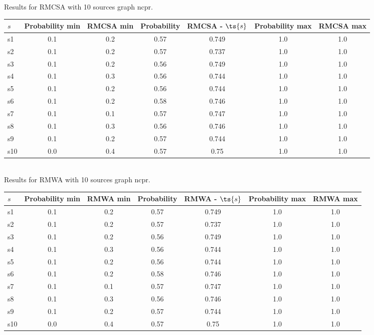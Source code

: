 \documentclass{article}
\begin{document}
\noindent Results for RMCSA with 10 sources graph ncpr.

\noindent\begin{tabular}{|l|c|c|c|c|c|c|}
\hline
$s$& Probability min & RMCSA min & Probability & RMCSA - $\ts{s}$ & Probability max & RMCSA max\\
\hline
s1 &0.1 & 0.2 & 0.57 & 0.749 & 1.0 & 1.0\\
\hline
s2 &0.1 & 0.2 & 0.57 & 0.737 & 1.0 & 1.0\\
\hline
s3 &0.1 & 0.2 & 0.56 & 0.749 & 1.0 & 1.0\\
\hline
s4 &0.1 & 0.3 & 0.56 & 0.744 & 1.0 & 1.0\\
\hline
s5 &0.1 & 0.2 & 0.56 & 0.744 & 1.0 & 1.0\\
\hline
s6 &0.1 & 0.2 & 0.58 & 0.746 & 1.0 & 1.0\\
\hline
s7 &0.1 & 0.1 & 0.57 & 0.747 & 1.0 & 1.0\\
\hline
s8 &0.1 & 0.3 & 0.56 & 0.746 & 1.0 & 1.0\\
\hline
s9 &0.1 & 0.2 & 0.57 & 0.744 & 1.0 & 1.0\\
\hline
s10 &0.0 & 0.4 & 0.57 & 0.75 & 1.0 & 1.0\\
\hline
\end{tabular}\\

\noindent Results for RMWA with 10 sources graph ncpr.

\noindent\begin{tabular}{|l|c|c|c|c|c|c|}
\hline
$s$& Probability min & RMWA min & Probability & RMWA - $\ts{s}$ & Probability max & RMWA max\\
\hline
s1 &0.1 & 0.2 & 0.57 & 0.749 & 1.0 & 1.0\\
\hline
s2 &0.1 & 0.2 & 0.57 & 0.737 & 1.0 & 1.0\\
\hline
s3 &0.1 & 0.2 & 0.56 & 0.749 & 1.0 & 1.0\\
\hline
s4 &0.1 & 0.3 & 0.56 & 0.744 & 1.0 & 1.0\\
\hline
s5 &0.1 & 0.2 & 0.56 & 0.744 & 1.0 & 1.0\\
\hline
s6 &0.1 & 0.2 & 0.58 & 0.746 & 1.0 & 1.0\\
\hline
s7 &0.1 & 0.1 & 0.57 & 0.747 & 1.0 & 1.0\\
\hline
s8 &0.1 & 0.3 & 0.56 & 0.746 & 1.0 & 1.0\\
\hline
s9 &0.1 & 0.2 & 0.57 & 0.744 & 1.0 & 1.0\\
\hline
s10 &0.0 & 0.4 & 0.57 & 0.75 & 1.0 & 1.0\\
\hline
\end{tabular}\\
\end{document}
